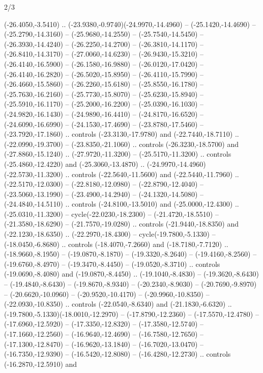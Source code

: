 \begin{flagdescription}{2/3}
\begin{scope}[xshift=0.5\flaglength,yshift=0.5\flagwidth,scale=\flagwidth/480]
\begin{scope}[y=0.80pt, x=0.80pt, yscale=-1,shift={(-450,-300)}]
  (-26.4050,-3.5410) .. (-23.9380,-0.9740)(-24.9970,-14.4960) --
  (-25.1420,-14.4690) -- (-25.2790,-14.3160) -- (-25.9680,-14.2550) --
  (-25.7540,-14.5450) -- (-26.3930,-14.4240) -- (-26.2250,-14.2700) --
  (-26.3810,-14.1170) -- (-26.8410,-14.3170) -- (-27.0060,-14.6230) --
  (-26.9430,-15.3210) -- (-26.4140,-16.5900) -- (-26.1580,-16.9880) --
  (-26.0120,-17.0420) -- (-26.4140,-16.2820) -- (-26.5020,-15.8950) --
  (-26.4110,-15.7990) -- (-26.4660,-15.5860) -- (-26.2260,-15.6180) --
  (-25.8550,-16.1780) -- (-25.7630,-16.2160) -- (-25.7730,-15.8070) --
  (-25.6230,-15.8940) -- (-25.5910,-16.1170) -- (-25.2000,-16.2200) --
  (-25.0390,-16.1030) -- (-24.9820,-16.1430) -- (-24.9890,-16.4410) --
  (-24.8170,-16.6520) -- (-24.6090,-16.6990) -- (-24.1530,-17.4690) --
  (-23.8780,-17.5460) -- (-23.7920,-17.1860) .. controls (-23.3130,-17.9780) and
  (-22.7440,-18.7110) .. (-22.0990,-19.3700) -- (-23.8350,-21.1060) .. controls
  (-26.3230,-18.5700) and (-27.8860,-15.1240) .. (-27.9720,-11.3200) --
  (-25.5170,-11.3200) .. controls (-25.4860,-12.4220) and (-25.3060,-13.4870) ..
  (-24.9970,-14.4960)(-22.5730,-11.3200) .. controls (-22.5640,-11.5600) and
  (-22.5440,-11.7960) .. (-22.5170,-12.0300) -- (-22.8180,-12.0980) --
  (-22.8790,-12.4040) -- (-23.5060,-13.1990) -- (-23.4900,-14.2940) --
  (-24.1320,-14.5080) -- (-24.4840,-14.5110) .. controls (-24.8100,-13.5010) and
  (-25.0000,-12.4300) .. (-25.0310,-11.3200) -- cycle(-22.0230,-18.2300) --
  (-21.4720,-18.5510) -- (-21.3580,-18.6290) -- (-21.7570,-19.0280) .. controls
  (-21.9440,-18.8350) and (-22.1230,-18.6350) .. (-22.2970,-18.4300) --
  cycle(-19.7800,-5.1330) -- (-18.0450,-6.8680) .. controls (-18.4070,-7.2660)
  and (-18.7180,-7.7120) .. (-18.9660,-8.1950) -- (-19.0870,-8.1870) --
  (-19.3320,-8.2640) -- (-19.4160,-8.2560) -- (-19.6760,-8.4970) --
  (-19.3470,-8.4450) -- (-19.0520,-8.3710) .. controls (-19.0690,-8.4080) and
  (-19.0870,-8.4450) .. (-19.1040,-8.4830) -- (-19.3620,-8.6430) --
  (-19.4840,-8.6430) -- (-19.8670,-8.9340) -- (-20.2340,-8.9030) --
  (-20.7690,-9.8970) -- (-20.6620,-10.0960) -- (-20.9520,-10.4170) --
  (-20.9960,-10.8350) -- (-22.0930,-10.8350) .. controls (-22.0540,-8.6340) and
  (-21.1830,-6.6320) .. (-19.7800,-5.1330)(-18.0010,-12.2970) --
  (-17.8790,-12.2360) -- (-17.5570,-12.4780) -- (-17.6960,-12.5920) --
  (-17.3350,-12.8320) -- (-17.3580,-12.5740) -- (-17.1660,-12.2560) --
  (-16.9640,-12.4690) -- (-16.7580,-12.7650) -- (-17.1300,-12.8470) --
  (-16.9620,-13.1840) -- (-16.7020,-13.0470) -- (-16.7350,-12.9390) --
  (-16.5420,-12.8080) -- (-16.4280,-12.2730) .. controls (-16.2870,-12.5910) and

\end{scope}
\end{scope}
\end{flagdescription}
